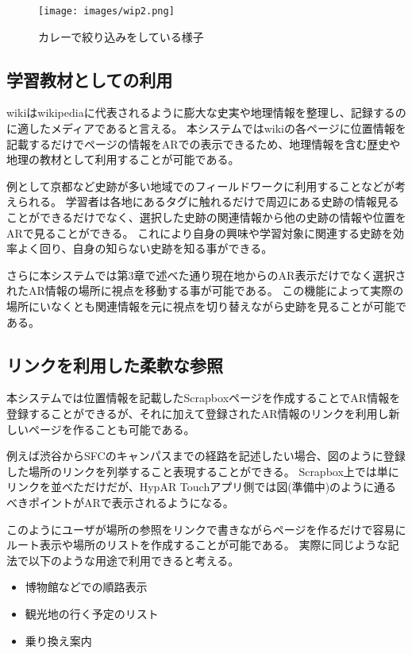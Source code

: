 \begin{figure}[h]
  \centering
  \texttt{[image: images/wip2.png]}
  \caption{カレーで絞り込みをしている様子} \label{fig:ar_navigation_jibotyo_link}
\end{figure}


\subsection{学習教材としての利用}
wikiはwikipediaに代表されるように膨大な史実や地理情報を整理し、記録するのに適したメディアであると言える。
本システムではwikiの各ページに位置情報を記載するだけでページの情報をARでの表示できるため、地理情報を含む歴史や地理の教材として利用することが可能である。

例として京都など史跡が多い地域でのフィールドワークに利用することなどが考えられる。
学習者は各地にあるタグに触れるだけで周辺にある史跡の情報見ることができるだけでなく、選択した史跡の関連情報から他の史跡の情報や位置をARで見ることができる。
これにより自身の興味や学習対象に関連する史跡を効率よく回り、自身の知らない史跡を知る事ができる。

さらに本システムでは第3章で述べた通り現在地からのAR表示だけでなく選択されたAR情報の場所に視点を移動する事が可能である。
この機能によって実際の場所にいなくとも関連情報を元に視点を切り替えながら史跡を見ることが可能である。



\subsection{リンクを利用した柔軟な参照}
\label{link_enum_notation}
本システムでは位置情報を記載したScrapboxページを作成することでAR情報を登録することができるが、それに加えて登録されたAR情報のリンクを利用し新しいページを作ることも可能である。

例えば渋谷からSFCのキャンパスまでの経路を記述したい場合、図のように登録した場所のリンクを列挙すること表現することができる。
Scrapbox上では単にリンクを並べただけだが、HypAR Touchアプリ側では図(準備中)のように通るべきポイントがARで表示されるようになる。

このようにユーザが場所の参照をリンクで書きながらページを作るだけで容易にルート表示や場所のリストを作成することが可能である。
実際に同じような記法で以下のような用途で利用できると考える。

\begin{itemize}
  \item 博物館などでの順路表示
  \item 観光地の行く予定のリスト
  \item 乗り換え案内
\end{itemize}

